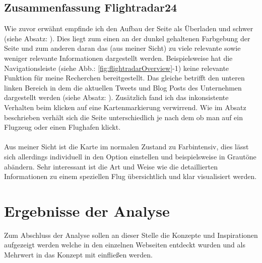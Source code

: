 \documentclass[../Bachelorarbeit.tex]{subfiles}
\begin{document}
\subsection{Zusammenfassung Flightradar24}
Wie zuvor erwähnt empfinde ich den Aufbau der Seite als Überladen und schwer (siehe Absatz: ). 
Dies liegt zum einen an der dunkel gehaltenen Farbgebung der Seite und zum anderen daran das (aus meiner Sicht) zu viele relevante sowie weniger relevante Informationen dargestellt werden.
Beispielsweise hat die Navigationsleiste (siehe Abb.: \ref{fig:flightradarOverview}-1) keine relevante Funktion für meine Recherchen bereitgestellt. 
Das gleiche betrifft den unteren linken Bereich in dem die aktuellen Tweets und Blog Posts des Unternehmen dargestellt werden (siehe Absatz: ). 
Zusätzlich fand ich das inkonsistente Verhalten beim klicken auf eine Kartenmarkierung verwirrend. 
Wie im Absatz  beschrieben verhält sich die Seite unterschiedlich je nach dem ob man auf ein Flugzeug oder einen Flughafen klickt.\\
\\
Aus meiner Sicht ist die Karte im normalen Zustand zu Farbintensiv, dies lässt sich allerdings individuell in den Option einstellen und beispielsweise in Grautöne abändern.
Sehr interessant ist die Art und Weise wie die detaillierten Informationen zu einem speziellen Flug übersichtlich und klar visualisiert werden.

\section{Ergebnisse der Analyse}
Zum Abschluss der Analyse sollen an dieser Stelle die Konzepte und Inspirationen aufgezeigt werden welche in den einzelnen Webseiten entdeckt wurden und als Mehrwert in das Konzept mit einfließen werden.
\end{document}
